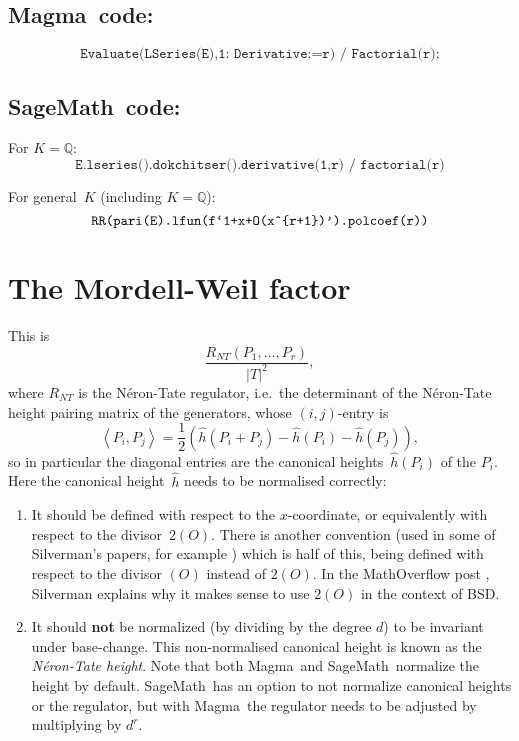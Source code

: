 \documentclass{amsart}
\newcommand{\software}[1]{\textsf{#1}} %
\newcommand{\Sage}{\software{SageMath}}
\newcommand{\Magma}{\software{Magma}{}}
\newcommand\Q{\mathbb{Q}}
\newcommand\hh{\hat{h}}
\begin{document}
\subsection{\Magma\ code:}\label{magma-2}

\[
\texttt{Evaluate(LSeries(E),1:\ Derivative:=r)\ /\ Factorial(r);}
\]

\subsection{\Sage\ code:}\label{sage-2}

For \(K=\Q\):
\[
\texttt{E.lseries().dokchitser().derivative(1,r)\ /\ factorial(r)}
\]

For general~$K$ (including $K=\Q$):
\[
\texttt{RR(pari(E).lfun(f`1+x+O(x\^{}\{r+1\})').polcoef(r))}\\
\]

\section{The Mordell-Weil factor}\label{mordell-weil-factor}

This is \[\frac{R_{NT}(P_1,\dots,P_r)}{|T|^2},\] where \(R_{NT}\) is
the N\'eron-Tate regulator, i.e.~the determinant of the N\'eron-Tate
height pairing matrix of the generators, whose \((i,j)\)-entry is
\[
\left\langle P_i,P_j\right\rangle = \frac{1}{2}(\hh(P_i+P_j) -
\hh(P_i) - \hh(P_j)),
\]
so in particular the diagonal entries are the canonical
heights~$\hh(P_i)$ of the \(P_i\).  Here the canonical height~$\hh$
needs to be normalised correctly:
\begin{enumerate}
\item It should be defined with respect to the \(x\)-coordinate, or
  equivalently with respect to the divisor~\(2(O)\). There is another
  convention (used in some of Silverman's papers, for example
  \cite{Silverman}) which is half of this, being defined with respect
  to the divisor \((O)\) instead of \(2(O)\). In the MathOverflow post
  \cite{MO}, Silverman explains why it makes sense to use \(2(O)\) in
  the context of BSD.
\item It should \textbf{not} be normalized (by dividing by the degree
  \(d\)) to be invariant under base-change. This non-normalised
  canonical height is known as the {\em N\'eron-Tate height}.  Note
  that both \Magma\ and \Sage\ normalize the height by
  default. \Sage\ has an option to not normalize canonical heights or
  the regulator, but with \Magma\ the regulator needs to be adjusted
  by multiplying by \(d^r\).
\end{enumerate}
\end{document}
